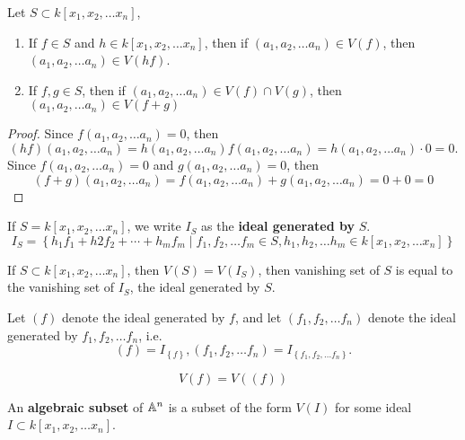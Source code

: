 \begin{lemma}
Let $S \subset k[x_1, x_2, \ldots x_n]$, 
\begin{enumerate}
 	\item If $f \in S$ and $h \in k[x_1, x_2, \ldots x_n]$, then if $(a_1, a_2, \ldots a_n) \in V(f)$, then $(a_1, a_2, \ldots a_n) \in V(hf)$.
 	\item If $f,g \in S$, then if $(a_1, a_2, \ldots a_n) \in V(f) \cap V(g)$, then $(a_1, a_2, \ldots a_n ) \in V(f + g)$
 \end{enumerate} 
\end{lemma}
\begin{proof}
Since $f(a_1, a_2, \ldots a_n) = 0$, then 
\[(hf)(a_1, a_2, \ldots a_n) = h(a_1, a_2, \ldots a_n)f(a_1, a_2, \ldots a_n) = h(a_1, a_2, \ldots a_n) \cdot 0 = 0.\]
Since $f(a_1, a_2, \ldots a_n) = 0$ and $g(a_1, a_2, \ldots a_n) = 0$, then
\[ (f + g)(a_1, a_2, \ldots a_n) = f(a_1, a_2, \ldots a_n) + g(a_1, a_2, \ldots a_n) = 0 + 0 = 0\]
\end{proof}

\begin{definition}
If $S = k[x_1, x_2, \ldots x_n ]$, we write $I_S$ as the \textbf{ideal generated by } $S$.
\[ I_S = \left\{  h_1 f_1 + h2 f_2 + \cdots + h_m f_m \mid f_1, f_2, \ldots f_m \in S, h_1, h_2, \ldots h_m \in k[x_1, x_2, \ldots x_n ]\right\} \] 
\end{definition}

\begin{corollary}
If $S \subset k[x_1, x_2, \ldots x_n ]$, then $V(S) = V(I_S)$, then vanishing set of $S$ is equal to the vanishing set of $I_S$, the ideal generated by $S$.
\end{corollary}

\begin{definition}
Let $\left( f \right)$ denote the ideal generated by $f$, and let $\left( f_1, f_2, \ldots f_n \right)$ denote the ideal generated by $f_1, f_2, \ldots f_n$, i.e.
\[ \left( f \right) = I_{\left\{ f \right\}}, \left( f_1, f_2, \ldots f_n  \right) = I_{\left\{ f_1, f_2, \ldots f_n \right\}}. \]
\end{definition}

\begin{corollary}
\[ V(f) = V( \left( f \right) )\]
\end{corollary}

\begin{definition}
An \textbf{algebraic subset} of $\mathbb A^n$ is a subset of the form $V(I)$ for some ideal $I \subset k[x_1, x_2, \ldots x_n]$.
\end{definition}

